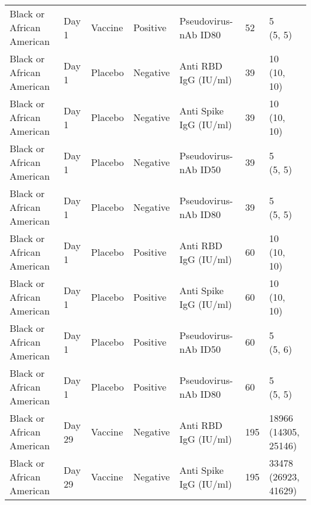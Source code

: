 \documentclass[]{book}
\theoremstyle{definition}
\theoremstyle{definition}
\theoremstyle{definition}
\newcommand{\1}{\mathbbm{1}}
\begin{document}
\begin{landscape}
\begin{ThreePartTable}
\begin{longtable}[t]{>{\raggedright\arraybackslash}p{7cm}llllll}
\hspace{1em}Black or African American & Day 1 & Vaccine & Positive & Pseudovirus-nAb ID80 & 52 & \makecell[l]{5\\(5, 5)}\\
\hspace{1em}Black or African American & Day 1 & Placebo & Negative & Anti RBD IgG (IU/ml) & 39 & \makecell[l]{10\\(10, 10)}\\
\hspace{1em}Black or African American & Day 1 & Placebo & Negative & Anti Spike IgG (IU/ml) & 39 & \makecell[l]{10\\(10, 10)}\\
\hspace{1em}Black or African American & Day 1 & Placebo & Negative & Pseudovirus-nAb ID50 & 39 & \makecell[l]{5\\(5, 5)}\\
\hspace{1em}Black or African American & Day 1 & Placebo & Negative & Pseudovirus-nAb ID80 & 39 & \makecell[l]{5\\(5, 5)}\\
\hspace{1em}Black or African American & Day 1 & Placebo & Positive & Anti RBD IgG (IU/ml) & 60 & \makecell[l]{10\\(10, 10)}\\
\hspace{1em}Black or African American & Day 1 & Placebo & Positive & Anti Spike IgG (IU/ml) & 60 & \makecell[l]{10\\(10, 10)}\\
\hspace{1em}Black or African American & Day 1 & Placebo & Positive & Pseudovirus-nAb ID50 & 60 & \makecell[l]{5\\(5, 6)}\\
\hspace{1em}Black or African American & Day 1 & Placebo & Positive & Pseudovirus-nAb ID80 & 60 & \makecell[l]{5\\(5, 5)}\\
\hspace{1em}Black or African American & Day 29 & Vaccine & Negative & Anti RBD IgG (IU/ml) & 195 & \makecell[l]{18966\\(14305, 25146)}\\
\hspace{1em}Black or African American & Day 29 & Vaccine & Negative & Anti Spike IgG (IU/ml) & 195 & \makecell[l]{33478\\(26923, 41629)}\\

\end{longtable}
\end{ThreePartTable}
\end{landscape}
\end{document}
